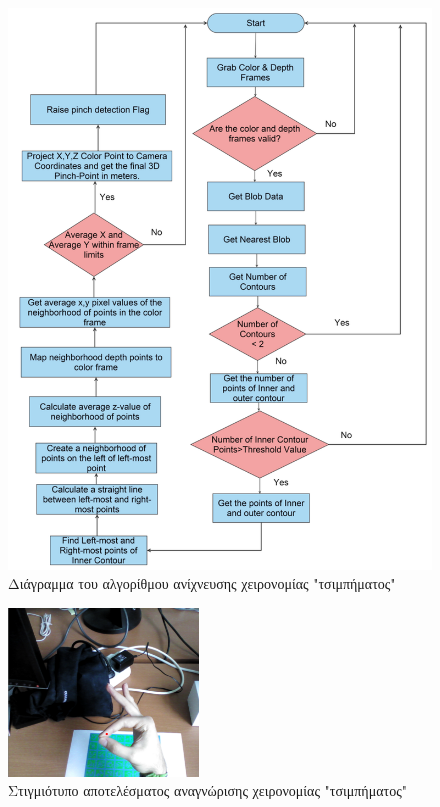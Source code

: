 \begin{figure}[H]
    \centering
    \includegraphics[width=.85\linewidth]{Files/Figures/pinch_gesture_detection.pdf}
    \caption[Διάγραμμα του αλγορίθμου ανίχνευσης χειρονομίας "τσιμπήματος"]{Διάγραμμα του αλγορίθμου ανίχνευσης χειρονομίας "τσιμπήματος"}
    \label{fig:gesture_rec}
\end{figure}



\begin{figure}[H]
    \centering
    \includegraphics[width=0.45\textwidth]{Files/Figures/pinch.png}
    \caption[Στιγμιότυπο αποτελέσματος αναγνώρισης χειρονομίας "τσιμπήματος"]{Στιγμιότυπο αποτελέσματος αναγνώρισης χειρονομίας "τσιμπήματος"}
    \label{fig:pinch results}
\end{figure}







